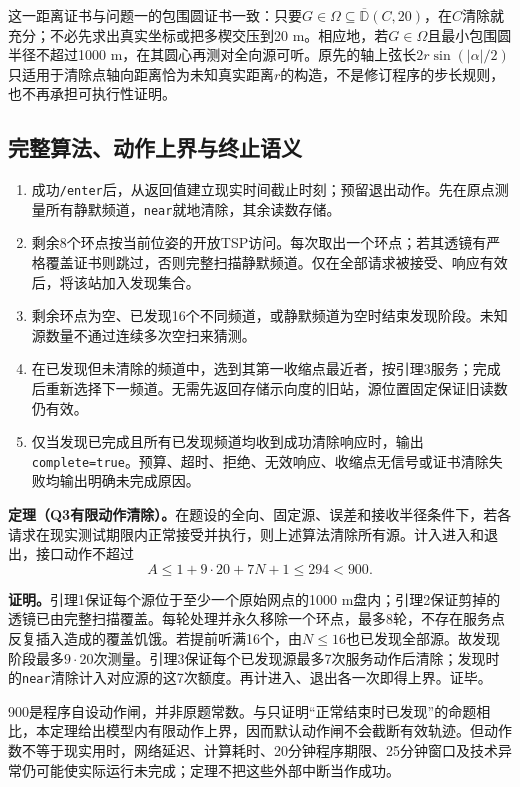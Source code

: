 这一距离证书与问题一的包围圆证书一致：只要$G\in\Omega\subseteq\overline{\mathbb D}(C,20)$，在$C$清除就充分；不必先求出真实坐标或把多楔交压到20 m。相应地，若$G\in\Omega$且最小包围圆半径不超过1000 m，在其圆心再测对全向源可听。原先的轴上弦长$2r\sin(|\alpha|/2)$只适用于清除点轴向距离恰为未知真实距离$r$的构造，不是修订程序的步长规则，也不再承担可执行性证明。

\subsection{完整算法、动作上界与终止语义}

\begin{enumerate}
\item 成功\texttt{/enter}后，从返回值建立现实时间截止时刻；预留退出动作。先在原点测量所有静默频道，\texttt{near}就地清除，其余读数存储。
\item 剩余8个环点按当前位姿的开放TSP访问。每次取出一个环点；若其透镜有严格覆盖证书则跳过，否则完整扫描静默频道。仅在全部请求被接受、响应有效后，将该站加入发现集合。
\item 剩余环点为空、已发现16个不同频道，或静默频道为空时结束发现阶段。未知源数量不通过连续多次空扫来猜测。
\item 在已发现但未清除的频道中，选到其第一收缩点最近者，按引理3服务；完成后重新选择下一频道。无需先返回存储示向度的旧站，源位置固定保证旧读数仍有效。
\item 仅当发现已完成且所有已发现频道均收到成功清除响应时，输出\texttt{complete=true}。预算、超时、拒绝、无效响应、收缩点无信号或证书清除失败均输出明确未完成原因。
\end{enumerate}

\textbf{定理（Q3有限动作清除）。}在题设的全向、固定源、误差和接收半径条件下，若各请求在现实测试期限内正常接受并执行，则上述算法清除所有源。计入进入和退出，接口动作不超过
\begin{equation}
A\le1+9\cdot20+7N+1\le294<900.\label{eq:q3actions}
\end{equation}

\textbf{证明。}引理1保证每个源位于至少一个原始网点的1000 m盘内；引理2保证剪掉的透镜已由完整扫描覆盖。每轮处理并永久移除一个环点，最多8轮，不存在服务点反复插入造成的覆盖饥饿。若提前听满16个，由$N\le16$也已发现全部源。故发现阶段最多$9\cdot20$次测量。引理3保证每个已发现源最多7次服务动作后清除；发现时的\texttt{near}清除计入对应源的这7次额度。再计进入、退出各一次即得上界。证毕。

900是程序自设动作闸，并非原题常数。与只证明“正常结束时已发现”的命题相比，本定理给出模型内有限动作上界，因而默认动作闸不会截断有效轨迹。但动作数不等于现实用时，网络延迟、计算耗时、20分钟程序期限、25分钟窗口及技术异常仍可能使实际运行未完成；定理不把这些外部中断当作成功。

